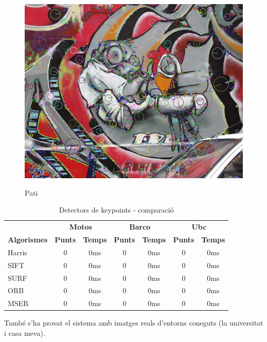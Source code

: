\begin{figure}[!htb]
				\label{fig:awesome_image2}
			\endminipage\hfill
				\includegraphics[width=\linewidth]{images/RobotKp}
				\label{fig:awesome_image3}
			\endminipage
			\caption{Pati}
		\end{figure}

		\begin{table}[H]
			\begin{center}
				\begin{tabular}{l | c c | c c | c c}
					& \multicolumn{2}{c|}{\textbf{Motos}} & \multicolumn{2}{c|}{\textbf{Barco}} & \multicolumn{2}{c}{\textbf{Ubc}} \\
					\textbf{Algorismes} & \textbf{Punts} & \textbf{Temps} & \textbf{Punts} & \textbf{Temps} & \textbf{Punts} & \textbf{Temps} \\ \hline
					Harris & 0 & 0ms & 0 & 0ms & 0 & 0ms \\
					SIFT & 0 & 0ms & 0 & 0ms & 0 & 0ms \\
					SURF & 0 & 0ms & 0 & 0ms & 0 & 0ms \\
					ORB & 0 & 0ms & 0 & 0ms & 0 & 0ms \\
					MSER & 0 & 0ms & 0 & 0ms & 0 & 0ms \\
				\end{tabular}
			\end{center}
			\caption{Detectors de keypoints - comparació}
		\end{table}
		\noindent
		També s'ha provat el sistema amb imatges reals d'entorns coneguts (la universitat i casa meva).

